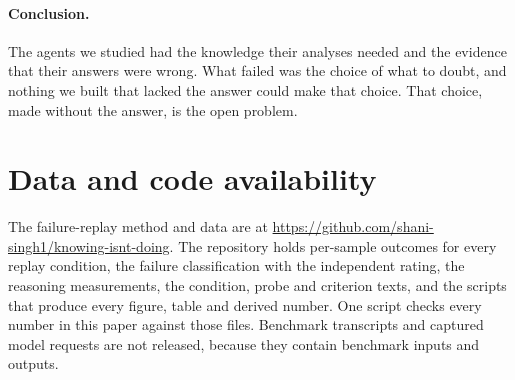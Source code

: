 \documentclass[10pt]{article}
\begin{document}
\paragraph{Conclusion.} The agents we studied had the knowledge their analyses needed and the evidence that their answers were wrong. What failed was
the choice of what to doubt, and nothing we built that lacked the answer could make that choice. That choice, made without the answer, is the open
problem.

\section*{Data and code availability}
The failure-replay method and data are at \url{https://github.com/shani-singh1/knowing-isnt-doing}. The repository holds per-sample outcomes for
every replay condition, the failure classification with the independent rating, the reasoning measurements, the condition, probe and criterion
texts, and the scripts that produce every figure, table and derived number. One script checks every number in this paper against those files.
Benchmark transcripts and captured model requests are not released, because they contain benchmark inputs and outputs.
\end{document}
